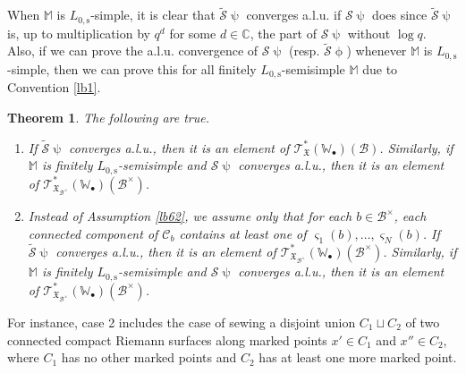 \documentclass[12pt,a4paper,notitlepage]{article}
\theoremstyle{definition}
\theoremstyle{plain}
\newtheorem{thm}[df]{Theorem}
\newcommand{\fk}{\mathfrak}
\newcommand{\mc}{\mathcal}
\newcommand{\wtd}{\widetilde}
\newcommand{\scr}{\mathscr}
\newcommand{\sgm}{\varsigma}
\newcommand{\blt}{\bullet}
\newcommand{\Wbb}{\mathbb W}
\newcommand{\Mbb}{\mathbb M}
\newcommand{\Cbb}{\mathbb C}
\newcommand{\Lss}{{L_{0,\mathrm{s}}}}
\numberwithin{equation}{section}
\begin{document}
When $\Mbb$ is $\Lss$-simple, it is clear that $\wtd{\mc S}\uppsi$ converges a.l.u. if  $\mc S\uppsi$ does since $\wtd{\mc S}\uppsi$ is, up to multiplication by $q^d$ for some $d\in\Cbb$, the part of $\mc S\uppsi$ without $\log q$. Also, if we can prove the a.l.u. convergence of $\mc S\uppsi$ (resp. $\wtd{\mc S}\upphi$) whenever $\Mbb$ is $\Lss$-simple, then we can prove this for all finitely $\Lss$-semisimple $\Mbb$ due to Convention \ref{lb1}.


\begin{thm}\label{lb47}
The following are true.
\begin{enumerate}
\item  If  $\wtd{\mc S}\uppsi$  converges a.l.u., then it is an element  of $\scr T_{\fk X}^*(\Wbb_\blt)(\mc B)$. Similarly, if $\Mbb$ is finitely $\Lss$-semisimple and $\mc S\uppsi$ converges a.l.u., then it is an element of $\scr T_{\fk X_{\mc B^\times}}^*(\Wbb_\blt)(\mc B^\times)$.
\item Instead of Assumption \ref{lb62}, we assume only that for each $b\in\mc B^\times$, each connected component of $\mc C_b$ contains at least one of $\sgm_1(b),\dots,\sgm_N(b)$. If  $\wtd{\mc S}\uppsi$  converges a.l.u., then it is an element  of $\scr T_{\fk X_{\mc B^\times}}^*(\Wbb_\blt)(\mc B^\times)$. Similarly, if $\Mbb$ is finitely $\Lss$-semisimple and $\mc S\uppsi$ converges a.l.u., then it is an element of $\scr T_{\fk X_{\mc B^\times}}^*(\Wbb_\blt)(\mc B^\times)$.
\end{enumerate}
\end{thm}




For instance, case 2 includes the case of sewing a disjoint union $C_1\sqcup C_2$ of two connected compact Riemann surfaces along marked points $x'\in C_1$ and $x''\in C_2$, where $C_1$ has no other marked points and $C_2$ has at least one more marked point. 
\end{document}
